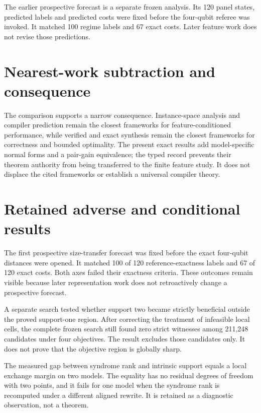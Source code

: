 \documentclass[a4paper,onecolumn,11pt,unpublished,noarxiv]{quantumarticle}
\begin{document}
The earlier prospective forecast is a separate frozen analysis.  Its 120 panel states, predicted labels and predicted costs were fixed before the four-qubit referee was invoked.  It matched 100 regime labels and 67 exact costs.  Later feature work does not revise those predictions.

\section{Nearest-work subtraction and consequence}\label{sec:nearest-work}

\NearestWorkTable
\FloatBarrier

The comparison supports a narrow consequence.  Instance-space analysis and compiler prediction remain the closest frameworks for feature-conditioned performance, while verified and exact synthesis remain the closest frameworks for correctness and bounded optimality.  The present exact results add model-specific normal forms and a pair-gain equivalence; the typed record prevents their theorem authority from being transferred to the finite feature study.  It does not displace the cited frameworks or establish a universal compiler theory.

\section{Retained adverse and conditional results}

The first prospective size-transfer forecast was fixed before the exact four-qubit distances were opened.  It matched 100 of 120 reference-exactness labels and 67 of 120 exact costs.  Both axes failed their exactness criteria.  These outcomes remain visible because later representation work does not retroactively change a prospective forecast.

A separate search tested whether support two became strictly beneficial outside the proved support-one region.  After correcting the treatment of infeasible local cells, the complete frozen search still found zero strict witnesses among 211,248 candidates under four objectives.  The result excludes those candidates only.  It does not prove that the objective region is globally sharp.

The measured gap between syndrome rank and intrinsic support equals a local exchange margin on two models.  The equality has no residual degrees of freedom with two points, and it fails for one model when the syndrome rank is recomputed under a different aligned rewrite.  It is retained as a diagnostic observation, not a theorem.
\end{document}
